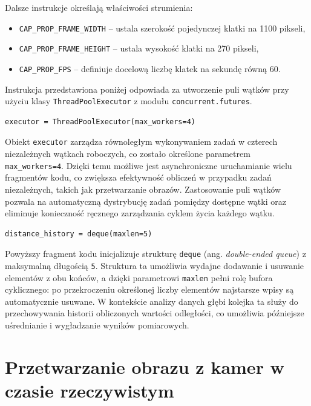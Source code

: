 \documentclass[magisterska]{pracadypl}
\begin{document}
Dalsze instrukcje określają właściwości strumienia:  
\begin{itemize}
    \item \texttt{CAP\_PROP\_FRAME\_WIDTH} – ustala szerokość pojedynczej klatki na 1100 pikseli,  
    \item \texttt{CAP\_PROP\_FRAME\_HEIGHT} – ustala wysokość klatki na 270 pikseli,  
    \item \texttt{CAP\_PROP\_FPS} – definiuje docelową liczbę klatek na sekundę równą 60.  
\end{itemize}

Instrukcja przedstawiona poniżej odpowiada za utworzenie puli wątków przy użyciu klasy 
\texttt{ThreadPoolExecutor} z modułu \texttt{concurrent.futures}.  

\begin{lstlisting}[style=mypython]
executor = ThreadPoolExecutor(max_workers=4)
\end{lstlisting}

Obiekt \texttt{executor} zarządza równoległym wykonywaniem zadań w czterech niezależnych 
wątkach roboczych, co zostało określone parametrem \texttt{max\_workers=4}. 
Dzięki temu możliwe jest asynchroniczne uruchamianie wielu fragmentów kodu, 
co zwiększa efektywność obliczeń w przypadku zadań niezależnych, takich jak 
przetwarzanie obrazów. Zastosowanie puli wątków pozwala na automatyczną dystrybucję zadań pomiędzy dostępne 
wątki oraz eliminuje konieczność ręcznego zarządzania cyklem życia każdego wątku.

\begin{lstlisting}[style=mypython]
distance_history = deque(maxlen=5)
\end{lstlisting}

Powyższy fragment kodu inicjalizuje strukturę \texttt{deque} (ang. \textit{double-ended queue}) z maksymalną długością \texttt{5}. Struktura ta umożliwia wydajne dodawanie i usuwanie elementów z obu końców, a dzięki parametrowi \texttt{maxlen} pełni rolę bufora cyklicznego: po przekroczeniu określonej liczby elementów najstarsze wpisy są automatycznie usuwane. W kontekście analizy danych głębi kolejka ta służy do przechowywania historii obliczonych wartości odległości, co umożliwia późniejsze uśrednianie i wygładzanie wyników pomiarowych.

\newpage

\section*{Przetwarzanie obrazu z kamer w czasie rzeczywistym}
\end{document}
